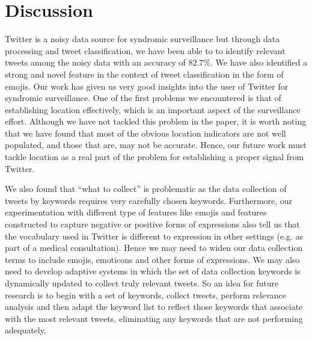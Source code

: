 \documentclass[10pt,letterpaper]{article}
\begin{document}
\section{Discussion}
\label{Discussion}
Twitter is a noisy data source for syndromic surveillance but through data processing and tweet classification, we have been able to to identify relevant tweets among the noisy data with an accuracy of $82.7\%$. We have also identified a strong and novel feature in the context of tweet classification in the form of emojis. Our work has given us very good insights into the user of Twitter for syndromic surveillance. One of the first problems we encountered is that of establishing location effectively, which is an important aspect of the surveillance effort.  Although we have not tackled this problem in the paper, it is worth noting that we have found that most of the obvious location indicators are not well populated, and those that are, may not be accurate.  Hence, our future work must tackle location as a real part of the problem for establishing a proper signal from Twitter.  

We also found that ``what to collect'' is problematic as the data collection of tweets by keywords requires very carefully chosen keywords. Furthermore, our experimentation with different type of features like emojis and features constructed to capture negative or positive forms of expressions also tell us that the vocabulary used in Twitter is different to expression in other settings (e.g. as part of a medical consultation).  Hence we may need to widen our data collection terms to include emojis, emoticons and other forms of expressions.  We may also need to develop adaptive systems in which the set of data collection keywords is dynamically updated to collect truly relevant tweets.  So an idea for future research is to begin with a set of keywords, collect tweets, perform relevance analysis and then adapt the keyword list to reflect those keywords  that associate with the most relevant tweets, eliminating any keywords that are not performing adequately. 

\end{document}
